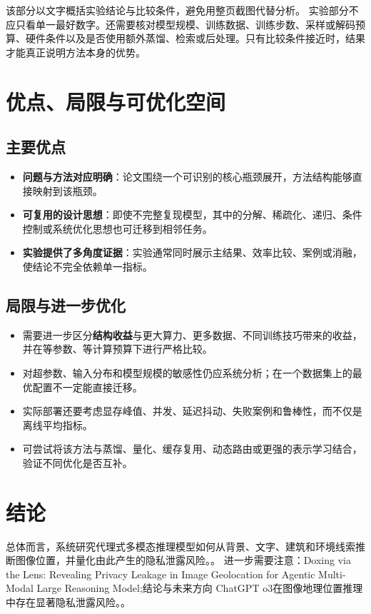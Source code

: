\documentclass[UTF8,11pt,a4paper]{ctexart}
\newcommand{\term}[1]{\textbf{\textcolor{mainblue}{#1}}}
\begin{document}
该部分以文字概括实验结论与比较条件，避免用整页截图代替分析。
实验部分不应只看单一最好数字。还需要核对模型规模、训练数据、训练步数、采样或解码预算、硬件条件以及是否使用额外蒸馏、检索或后处理。只有比较条件接近时，结果才能真正说明方法本身的优势。

\section{优点、局限与可优化空间}
\subsection{主要优点}
\begin{itemize}
\item \term{问题与方法对应明确}：论文围绕一个可识别的核心瓶颈展开，方法结构能够直接映射到该瓶颈。
\item \term{可复用的设计思想}：即使不完整复现模型，其中的分解、稀疏化、递归、条件控制或系统优化思想也可迁移到相邻任务。
\item \term{实验提供了多角度证据}：实验通常同时展示主结果、效率比较、案例或消融，使结论不完全依赖单一指标。
\end{itemize}

\subsection{局限与进一步优化}
\begin{itemize}
\item 需要进一步区分\term{结构收益}与更大算力、更多数据、不同训练技巧带来的收益，并在等参数、等计算预算下进行严格比较。
\item 对超参数、输入分布和模型规模的敏感性仍应系统分析；在一个数据集上的最优配置不一定能直接迁移。
\item 实际部署还要考虑显存峰值、并发、延迟抖动、失败案例和鲁棒性，而不仅是离线平均指标。
\item 可尝试将该方法与蒸馏、量化、缓存复用、动态路由或更强的表示学习结合，验证不同优化是否互补。
\end{itemize}

\section{结论}
总体而言，系统研究代理式多模态推理模型如何从背景、文字、建筑和环境线索推断图像位置，并量化由此产生的隐私泄露风险。。 进一步需要注意：Doxing via the Lens: Revealing Privacy Leakage in Image Geolocation for Agentic Multi-Modal Large Reasoning Model;结论与未来方向 ChatGPT o3在图像地理位置推理中存在显著隐私泄露风险。。
\end{document}
